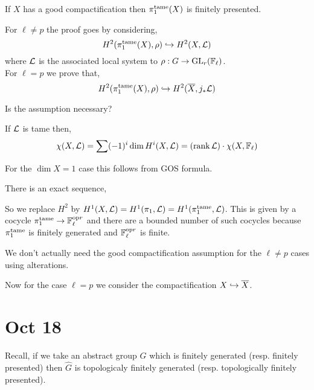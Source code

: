 \documentclass[12pt]{article}
\begin{document}
\begin{theorem}
If $X$ has a good compactification then $\pi_1^{\mathrm{tame}}(X)$ is finitely presented. 
\end{theorem}

\begin{rmk}
For $\ell \neq p$ the proof goes by considering,
\[ H^2(\pi_1^{\mathrm{tame}}(X), \rho) \hookrightarrow H^2(X, \mathcal{L}) \]
where $\mathcal{L}$ is the associated local system to $\rho : G \to \mathrm{GL}_r(\mathbb{F}_{\ell})$. 
\bigskip\\
For $\ell = p$ we prove that,
\[ H^2(\pi_1^{\mathrm{tame}}(X), \rho) \hookrightarrow H^2(\overline{X}, j_* \mathcal{L}) \]
\end{rmk}

\begin{rmk}
Is the assumption necessary? 
\end{rmk}

\begin{lemma}[Delgine]
If $\mathcal{L}$ is tame then,
\[ \chi(X, \mathcal{L}) = \sum (-1)^i \dim H^i(X, \mathcal{L}) = (\operatorname{\mathrm{rank}}{\mathcal{L}}) \cdot \chi(X, \mathbb{F}_\ell) \]
\end{lemma}

\begin{rmk}
For the $\dim{X} = 1$ case this follows from GOS formula.
\end{rmk}

There is an exact sequence,
\begin{center}
\end{center}
So we replace $H^2$ by $H^1(X, \mathcal{L}) = H^1(\pi_1, \mathcal{L}) = H^1(\pi_1^{\mathrm{tame}}, \mathcal{L})$. This is given by a cocycle $\pi_1^{\mathrm{tame}} \to \mathbb{F}_\ell^{\mathrm{op} r}$ and there are a bounded number of such cocycles because $\pi_1^{\mathrm{tame}}$ is finitely generated and $\mathbb{F}_{\ell}^{\mathrm{op} r}$ is finite. 


\begin{rmk}
We don't actually need the good compactification assumption for the $\ell \neq p$ cases using alterations.
\end{rmk}

Now for the case $\ell = p$ we consider the compactification $X \hookrightarrow \overline{X}$. 

\section{Oct 18}

\begin{rmk}
Recall, if we take an abstract group $G$ which is finitely generated (resp. finitely presented) then $\widehat{G}$ is topologicaly finitely generated (resp. topologically finitely presented). 
\end{rmk}
\end{document}
